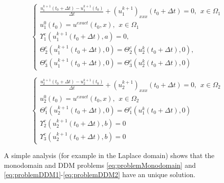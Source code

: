 \begin{equation}
    \label{eq:problemDDM1}
    \begin{cases}
        \frac{u_1^{k+1}(t_0+\Delta t) - u_1^{k+1}(t_0)}{\Delta t} + (u_1^{k+1})_{xxx}(t_0+\Delta t) = 0 , \ \ x \in \Omega_1\\
        u_1^{0}(t_0) = u^{exact}(t_0,x) , \ \ x \in \Omega_1 \\
        \Upsilon_1^{c}(u_1^{k+1}(t_0+\Delta t),a) = 0, \\ 
        \Theta_2^{c}(u_1^{k+1}(t_0+\Delta t),0) = \Theta_2^{c}(u_2^{k}(t_0+\Delta t),0) , \\
        \Theta_3^{c}(u_1^{k+1}(t_0+\Delta t),0) = \Theta_3^{c}(u_2^{k}(t_0+\Delta t),0)
     \end{cases}
\end{equation}

\begin{equation}
    \label{eq:problemDDM2}
    \begin{cases}
        \frac{u_2^{k+1}(t_0+\Delta t) - u_2^{k+1}(t_0)}{\Delta t} + (u_2^{k+1})_{xxx}(t_0+\Delta t) = 0 , \ \ x \in \Omega_2\\
        u_2^{0}(t_0) = u^{exact}(t_0,x) , \ \ x \in \Omega_2 \\
        \Theta_1^{c}(u_2^{k+1}(t_0+\Delta t),0) = \Theta_1^{c}(u_1^{k}(t_0+\Delta t),0) \\
        \Upsilon_2^{c}(u_2^{k+1}(t_0+\Delta t),b) = 0 \\
        \Upsilon_3^{c}(u_2^{k+1}(t_0+\Delta t),b) = 0
     \end{cases}
\end{equation}

\noindent {}


\indent A simple analysis (for example in the Laplace domain) shows that the monodomain and DDM problems \eqref{eq:problemMonodomain} and \eqref{eq:problemDDM1}-\eqref{eq:problemDDM2} have an unique solution.

\indent {}

